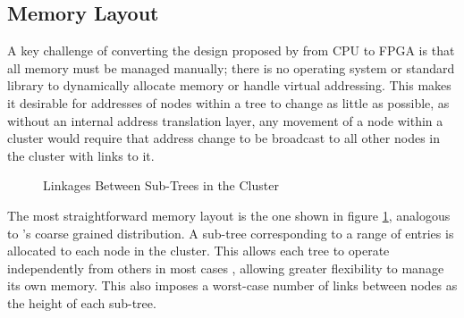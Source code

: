 \subsection{Memory Layout}

A key challenge of converting the design proposed by \citeauthor{base} from CPU to FPGA is that all memory must be managed manually; there is no operating system or standard library to dynamically allocate memory or handle virtual addressing. This makes it desirable for addresses of nodes within a tree to change as little as possible, as without an internal address translation layer, any movement of a node within a cluster would require that address change to be broadcast to all other nodes in the cluster with links to it.

\newcommand{\clusternode}[1]{
	\draw ({(#1)*6}, 0) ++(-2.75, 0.5) rectangle ++(5.5, -3);
	\node[tree] at ({(#1)*6}, 0) (n#1 00) {};
	\foreach \r [
		evaluate = \r as \w using int(3^\r),
		evaluate = \r as \wl using int(3^\r-1)
	] in {1,...,2} {
		\foreach \c [
			evaluate = \c as \i using int((\w-1)/2 + \c-1),
			evaluate = \c as \pr using int(\r-1),
			evaluate = \c as \pc using int(\c/3),
			evaluate = \c as \cl using int(\c-1)
		] in {0,...,\wl} {
			\node[tree] (n#1 \r\c)
				at ({(#1)*6 + (\c-int(\w/2)) / (\w/5)}, -\r) {};
			\draw[->] (n#1 \pr\pc) -- (n#1 \r\c);
			\ifthenelse{\c=0}{}{
				\draw[->] (n#1 \r\cl) -- (n#1 \r\c);
			}
		}
	}
}

\begin{figure}
	\centering
	\caption{Linkages Between Sub-Trees in the Cluster}
\label{coarse-link}
\end{figure}

The most straightforward memory layout is the one shown in figure \ref{coarse-link}, analogous to \citeauthor{base}'s coarse grained distribution. A sub-tree corresponding to a range of entries is allocated to each node in the cluster. This allows each tree to operate independently from others in most cases \autocite{ma-tpds-2022}, allowing greater flexibility to manage its own memory. This also imposes a worst-case number of links between nodes as the height of each sub-tree.
